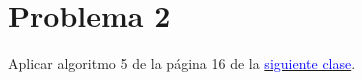 \section*{Problema 2}
Aplicar algoritmo 5 de la página 16 de la \href{http://fosorios.mat.utfsm.cl/files/notes/MAT468_slides-12.pdf}{\textcolor{blue}{siguiente clase}}.